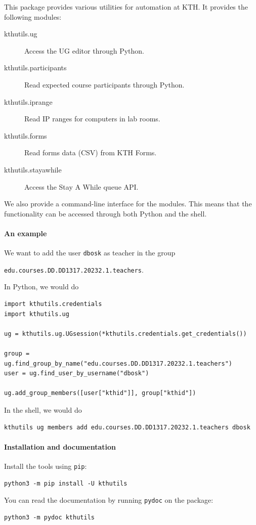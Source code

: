 This package provides various utilities for automation at KTH.
It provides the following modules:
\begin{description}
  \item[kthutils.ug] Access the UG editor through Python.
  \item[kthutils.participants] Read expected course participants through 
    Python.
  \item[kthutils.iprange] Read IP ranges for computers in lab rooms.
  \item[kthutils.forms] Read forms data (CSV) from KTH Forms.
  \item[kthutils.stayawhile] Access the Stay A While queue API.
\end{description}

We also provide a command-line interface for the modules.
This means that the functionality can be accessed through both Python and the 
shell.

\paragraph{An example}

We want to add the user \texttt{dbosk} as teacher in the 
group
\begin{center}
  \texttt{edu.courses.DD.DD1317.20232.1.teachers}.
\end{center}

In Python, we would do
\begin{verbatim}
import kthutils.credentials
import kthutils.ug

ug = kthutils.ug.UGsession(*kthutils.credentials.get_credentials())

group = ug.find_group_by_name("edu.courses.DD.DD1317.20232.1.teachers")
user = ug.find_user_by_username("dbosk")

ug.add_group_members([user["kthid"]], group["kthid"])
\end{verbatim}

In the shell, we would do
\begin{verbatim}
kthutils ug members add edu.courses.DD.DD1317.20232.1.teachers dbosk
\end{verbatim}

\paragraph{Installation and documentation}

Install the tools using \texttt{pip}:
\begin{verbatim}
python3 -m pip install -U kthutils
\end{verbatim}

You can read the documentation by running \texttt{pydoc} on the package:
\begin{verbatim}
python3 -m pydoc kthutils
\end{verbatim}
